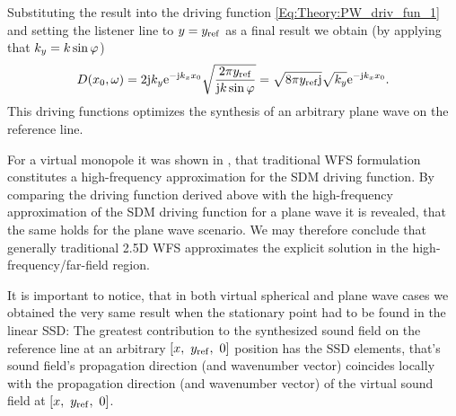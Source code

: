 Substituting the result into the driving function \eqref{Eq:Theory:PW_driv_fun_1} and setting the listener line to $y = y_{\mathrm{ref}}$ as a final result we obtain (by applying that $k_y = k \sin\varphi$)
\begin{equation}
D(x_0,\omega) = 2 \mathrm{j} k_y \mathrm{e}^{-\mathrm{j}  k_x x_0} \sqrt{\frac{2\pi y_{\mathrm{ref}}}{ \mathrm{j} k \sin\varphi }} = \sqrt{8\pi y_{\mathrm{ref}} \mathrm{j}} \sqrt{k_y} \mathrm{e}^{-\mathrm{j}  k_x x_0} .
\end{equation}
This driving functions optimizes the synthesis of an arbitrary plane wave on the reference line.

For a virtual monopole it was shown in \cite{Spors2010:analysis_and_improvement}, that traditional WFS formulation constitutes a high-frequency approximation for the SDM driving function. By comparing the driving function derived above with the high-frequency approximation of the SDM driving function for a plane wave \cite[Eq.~3.105]{Ahrens2012} it is revealed, that the same holds for the plane wave scenario. We may therefore conclude that generally traditional 2.5D WFS approximates the explicit solution in the high-frequency/far-field region.

\vspace{3mm}
It is important to notice, that in both virtual spherical and plane wave cases we obtained the very same result when the stationary point had to be found in the linear SSD:
The greatest contribution to the synthesized sound field on the reference line  at an arbitrary $[x,\ \yref,\ 0]$ position has the SSD elements, that's sound field's propagation  direction (and wavenumber vector) coincides locally with the propagation direction (and wavenumber vector) of the virtual sound field at $[x,\ \yref,\ 0]$. %

